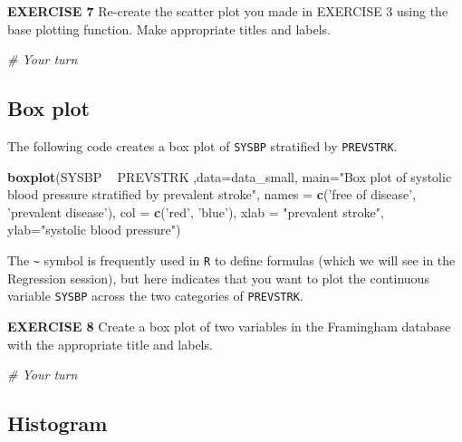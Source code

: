 \documentclass[
]{article}
\newenvironment{Shaded}{\begin{snugshade}}{\end{snugshade}}
\newcommand{\CommentTok}[1]{\textcolor[rgb]{0.56,0.35,0.01}{\textit{#1}}}
\newcommand{\DataTypeTok}[1]{\textcolor[rgb]{0.13,0.29,0.53}{#1}}
\newcommand{\KeywordTok}[1]{\textcolor[rgb]{0.13,0.29,0.53}{\textbf{#1}}}
\newcommand{\NormalTok}[1]{#1}
\newcommand{\OperatorTok}[1]{\textcolor[rgb]{0.81,0.36,0.00}{\textbf{#1}}}
\newcommand{\StringTok}[1]{\textcolor[rgb]{0.31,0.60,0.02}{#1}}
\begin{document}
\textbf{EXERCISE 7} Re-create the scatter plot you made in EXERCISE 3
using the base plotting function. Make appropriate titles and labels.

\begin{Shaded}
\begin{Highlighting}[]
\CommentTok{# Your turn}
\end{Highlighting}
\end{Shaded}

\hypertarget{box-plot}{%
\subsection{Box plot}\label{box-plot}}

The following code creates a box plot of \texttt{SYSBP} stratified by
\texttt{PREVSTRK}.

\begin{Shaded}
\begin{Highlighting}[]
\KeywordTok{boxplot}\NormalTok{(SYSBP }\OperatorTok{~}\StringTok{ }\NormalTok{PREVSTRK ,}\DataTypeTok{data=}\NormalTok{data_small, }
        \DataTypeTok{main=}\StringTok{"Box plot of systolic blood pressure stratified }
\StringTok{        by prevalent stroke"}\NormalTok{,}
        \DataTypeTok{names =} \KeywordTok{c}\NormalTok{(}\StringTok{'free of disease'}\NormalTok{, }\StringTok{'prevalent disease'}\NormalTok{),}
        \DataTypeTok{col =} \KeywordTok{c}\NormalTok{(}\StringTok{'red'}\NormalTok{, }\StringTok{'blue'}\NormalTok{),}
        \DataTypeTok{xlab =} \StringTok{"prevalent stroke"}\NormalTok{, }\DataTypeTok{ylab=}\StringTok{"systolic blood pressure"}\NormalTok{)}
\end{Highlighting}
\end{Shaded}

The \texttt{\textasciitilde{}} symbol is frequently used in \texttt{R}
to define formulas (which we will see in the Regression session), but
here indicates that you want to plot the continuous variable
\texttt{SYSBP} across the two categories of \texttt{PREVSTRK}.

\textbf{EXERCISE 8} Create a box plot of two variables in the Framingham
database with the appropriate title and labels.

\begin{Shaded}
\begin{Highlighting}[]
\CommentTok{# Your turn}
\end{Highlighting}
\end{Shaded}

\hypertarget{histogram}{%
\subsection{Histogram}\label{histogram}}
\end{document}
